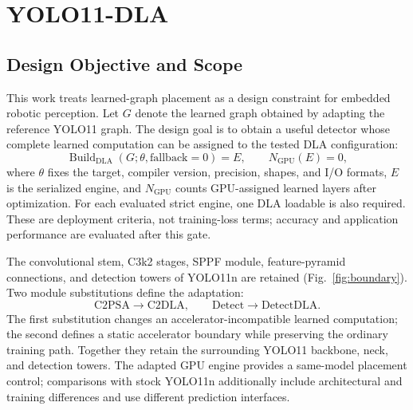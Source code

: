 \section{YOLO11-DLA}
\label{sec:method}

\subsection{Design Objective and Scope}
This work treats learned-graph placement as a design constraint for embedded
robotic perception. Let $G$ denote the learned graph obtained by adapting the
reference YOLO11 graph. The design goal is to obtain a useful detector whose
complete learned computation can be assigned to the tested DLA configuration:
\begin{equation}
 \operatorname{Build}_{\mathrm{DLA}}(G;\theta,\mathrm{fallback}=0)
 = E, \qquad N_{\mathrm{GPU}}(E)=0,
 \label{eq:accept}
\end{equation}
where $\theta$ fixes the target, compiler version, precision, shapes, and
I/O formats, $E$ is the serialized engine, and $N_{\mathrm{GPU}}$ counts
GPU-assigned learned layers after optimization. For each evaluated strict
engine, one DLA loadable is also required. These are deployment criteria, not training-loss
terms; accuracy and application performance are evaluated after this gate.

The convolutional stem, C3k2 stages, SPPF module, feature-pyramid connections,
and detection towers of YOLO11n are retained (Fig.~\ref{fig:boundary}). Two module substitutions define
the adaptation:
\begin{equation}
 \mathrm{C2PSA}\longrightarrow\mathrm{C2DLA},\qquad
 \mathrm{Detect}\longrightarrow\mathrm{DetectDLA}.
 \label{eq:substitutions}
\end{equation}
The first substitution changes an accelerator-incompatible learned computation;
the second defines a static accelerator boundary while preserving the ordinary
training path. Together they retain the surrounding YOLO11 backbone, neck,
and detection towers. The adapted GPU engine provides a same-model placement
control; comparisons with stock YOLO11n additionally include architectural and
training differences and use different prediction interfaces.


